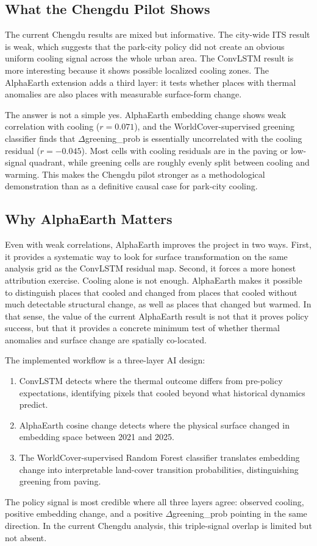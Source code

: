\documentclass{article}
\begin{document}
\subsection{What the Chengdu Pilot Shows}

The current Chengdu results are mixed but informative. The city-wide ITS result
is weak, which suggests that the park-city policy did not create an obvious
uniform cooling signal across the whole urban area. The ConvLSTM result is more
interesting because it shows possible localized cooling zones. The AlphaEarth
extension adds a third layer: it tests whether places with thermal anomalies are
also places with measurable surface-form change.

The answer is not a simple yes. AlphaEarth embedding change shows weak
correlation with cooling ($r = 0.071$), and the WorldCover-supervised greening
classifier finds that $\Delta$greening\_prob is essentially uncorrelated with
the cooling residual ($r = -0.045$). Most cells with cooling residuals are in
the paving or low-signal quadrant, while greening cells are roughly evenly
split between cooling and warming. This makes the Chengdu pilot stronger as a
methodological demonstration than as a definitive causal case for park-city
cooling.

\subsection{Why AlphaEarth Matters}

Even with weak correlations, AlphaEarth improves the project in two ways.
First, it provides a systematic way to look for surface transformation on the
same analysis grid as the ConvLSTM residual map. Second, it forces a more
honest attribution exercise. Cooling alone is not enough. AlphaEarth makes it
possible to distinguish places that cooled and changed from places that cooled
without much detectable structural change, as well as places that changed but
warmed. In that sense, the value of the current AlphaEarth result is not that
it proves policy success, but that it provides a concrete minimum test of
whether thermal anomalies and surface change are spatially co-located.

The implemented workflow is a three-layer AI design:
\begin{enumerate}
  \item ConvLSTM detects where the thermal outcome differs from pre-policy
  expectations, identifying pixels that cooled beyond what historical
  dynamics predict.
  \item AlphaEarth cosine change detects where the physical surface changed
  in embedding space between 2021 and 2025.
  \item The WorldCover-supervised Random Forest classifier translates embedding
  change into interpretable land-cover transition probabilities, distinguishing
  greening from paving.
\end{enumerate}
The policy signal is most credible where all three layers agree: observed
cooling, positive embedding change, and a positive $\Delta$greening\_prob
pointing in the same direction. In the current Chengdu analysis, this
triple-signal overlap is limited but not absent.
\end{document}
